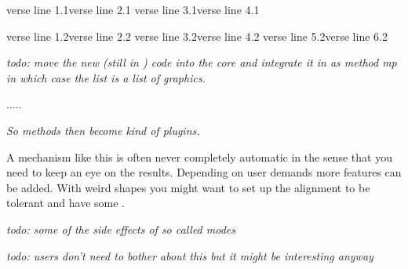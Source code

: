 \startshapedparagraph[list=test,method=cycle]
    verse line 1.1\crlf verse line 2.1\crlf
    verse line 3.1\crlf verse line 4.1\par
    verse line 1.2\crlf verse line 2.2\crlf
    verse line 3.2\crlf verse line 4.2\crlf
    verse line 5.2\crlf verse line 6.2\par
\stopshapedparagraph
\stopbuffer

\typebuffer[option=TEX]

\getbuffer

{\em todo: move the new (still in {\em {})} code into the
core and integrate it in {\em \type {\startshapedparagraph}} as method {\em \type
{mp}} in which case the list is a list of graphics.}

\starttyping[option=TEX]
\startshapedparagraph[list={test 1,test 2,test 3,test 4},method=mp]
    .....
\stopshapedparagraph
\stoptyping

{\em So methods then become kind of plugins.}

A mechanism like this is often never completely automatic in the sense that you
need to keep an eye on the results. Depending on user demands more features can
be added. With weird shapes you might want to set up the alignment to be \type
{tolerant} and have some .

\stopsection

\startsection[title=Modes]


{\em todo: some of the side effects of so called modes}

\stopsection

\startsection[title=Normalization]

{\em todo: users don't need to bother about this but it might be interesting anyway}

\stopsection

\stopdocument

